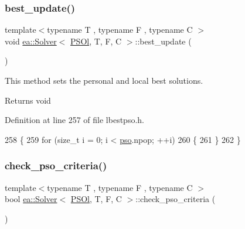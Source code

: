 \subsubsection{\texorpdfstring{best\+\_\+update()}{best\_update()}}
{\footnotesize\ttfamily template$<$typename T , typename F , typename C $>$ \\
void \hyperlink{classea_1_1_solver}{ea\+::\+Solver}$<$ \hyperlink{structea_1_1_p_s_ol}{P\+S\+Ol}, T, F, C $>$\+::best\+\_\+update (\begin{DoxyParamCaption}{ }\end{DoxyParamCaption})\hspace{0.3cm}{\ttfamily [private]}}



This method sets the personal and local best solutions. 

\begin{DoxyReturn}{Returns}
void 
\end{DoxyReturn}


Definition at line 257 of file lbestpso.\+h.


\begin{DoxyCode}
258     \{
259         \textcolor{keywordflow}{for} (\textcolor{keywordtype}{size\_t} i = 0; i < \hyperlink{classea_1_1_solver_3_01_p_s_ol_00_01_t_00_01_f_00_01_c_01_4_a3098f083ef04a0ce7ae0eef22dd80442}{pso}.npop; ++i)
260         \{
261         \}
262     \}
\end{DoxyCode}
\mbox{\label{classea_1_1_solver_3_01_p_s_ol_00_01_t_00_01_f_00_01_c_01_4_a474c18a8544f7ae0d5fe9d1587de2ad3}} 
\subsubsection{\texorpdfstring{check\+\_\+pso\+\_\+criteria()}{check\_pso\_criteria()}}
{\footnotesize\ttfamily template$<$typename T , typename F , typename C $>$ \\
bool \hyperlink{classea_1_1_solver}{ea\+::\+Solver}$<$ \hyperlink{structea_1_1_p_s_ol}{P\+S\+Ol}, T, F, C $>$\+::check\+\_\+pso\+\_\+criteria (\begin{DoxyParamCaption}{ }\end{DoxyParamCaption})\hspace{0.3cm}{\ttfamily [private]}}




